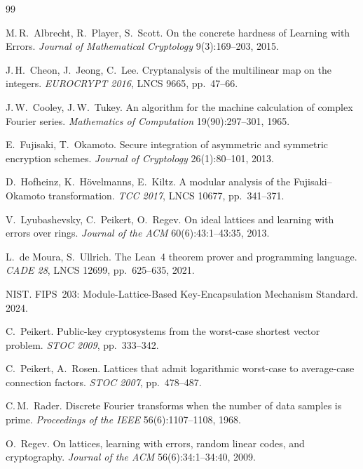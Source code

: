 \documentclass[11pt,a4paper]{article}
\theoremstyle{remark}
\begin{document}
\begin{thebibliography}{99}

M.\,R.\ Albrecht, R.\ Player, S.\ Scott.
On the concrete hardness of Learning with Errors.
\emph{Journal of Mathematical Cryptology} 9(3):169--203, 2015.

J.\,H.\ Cheon, J.\ Jeong, C.\ Lee.
Cryptanalysis of the multilinear map on the integers.
\emph{EUROCRYPT 2016}, LNCS 9665, pp.\ 47--66.

J.\,W.\ Cooley, J.\,W.\ Tukey.
An algorithm for the machine calculation of complex Fourier series.
\emph{Mathematics of Computation} 19(90):297--301, 1965.

E.\ Fujisaki, T.\ Okamoto.
Secure integration of asymmetric and symmetric encryption schemes.
\emph{Journal of Cryptology} 26(1):80--101, 2013.

D.\ Hofheinz, K.\ H\"ovelmanns, E.\ Kiltz.
A modular analysis of the Fujisaki--Okamoto transformation.
\emph{TCC 2017}, LNCS 10677, pp.\ 341--371.

V.\ Lyubashevsky, C.\ Peikert, O.\ Regev.
On ideal lattices and learning with errors over rings.
\emph{Journal of the ACM} 60(6):43:1--43:35, 2013.

L.\ de Moura, S.\ Ullrich.
The Lean~4 theorem prover and programming language.
\emph{CADE 28}, LNCS 12699, pp.\ 625--635, 2021.

NIST.
FIPS~203: Module-Lattice-Based Key-Encapsulation Mechanism Standard. 2024.

C.\ Peikert.
Public-key cryptosystems from the worst-case shortest vector problem.
\emph{STOC 2009}, pp.\ 333--342.

C.\ Peikert, A.\ Rosen.
Lattices that admit logarithmic worst-case to average-case connection factors.
\emph{STOC 2007}, pp.\ 478--487.

C.\,M.\ Rader.
Discrete Fourier transforms when the number of data samples is prime.
\emph{Proceedings of the IEEE} 56(6):1107--1108, 1968.

O.\ Regev.
On lattices, learning with errors, random linear codes, and cryptography.
\emph{Journal of the ACM} 56(6):34:1--34:40, 2009.

\end{thebibliography}
\end{document}
